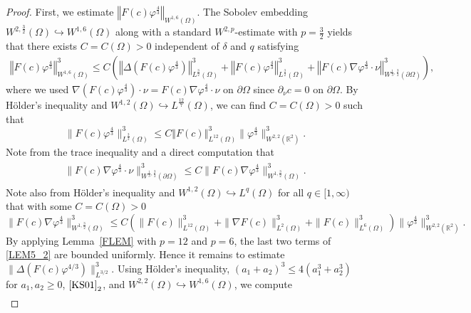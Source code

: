 \documentclass{amsart}
\numberwithin{equation}{section}
\newcommand{\R}{{ \mathbb{R}  }}
\newcommand{\bke}[1]{\left( #1 \right)}
\newcommand{\norm}[1]{\left\Vert #1 \right\Vert}
\begin{document}
\begin{proof}
First, we estimate $\norm{   F(c)  \varphi^{\frac{4}{3}}}_{W^{1,6}(\Omega)}$.
The Sobolev embedding $W^{2,\frac{3}{2}}(\Omega)\hookrightarrow W^{1,6}(\Omega)$ along with 
a standard $W^{2,p}$-estimate with $p=\frac{3}{2}$
yields that there exists $C=C(\Omega)>0$ independent of $\delta$ and $q$ satisfying
\begin{equation}\label{LEM5_2}
\begin{aligned}
 \norm{   F(c)  \varphi^{\frac{4}{3}}}_{W^{1,6}(\Omega)}^{3}
 \le C\bke{  \norm{\Delta \bke{  F(c)   \varphi^{\frac{4}{3}} } }_{L^{\frac{3}{2}}(\Omega)}^{3} +\norm{    F(c)   \varphi^{\frac{4}{3}}}_{L^{\frac{3}{2}}(\Omega)}^{3} +\norm{ F(c)\nabla \varphi^{\frac{4}{3}} \cdot \nu }_{W^{\frac{1}{3},\frac{3}{2}}(\partial\Omega)}^{3} },
\end{aligned}
\end{equation}
where we used
$\nabla(F(c)\varphi^{\frac{4}{3}})\cdot\nu=F(c)\nabla \varphi^{\frac{4}{3}} \cdot \nu$ on $\partial\Omega$ since $\partial_{\nu} c = 0$ on $\partial \Omega$. 
By H\"older's inequality and   $W^{1,2}(\Omega)\hookrightarrow L^{\frac{12}{7}}(\Omega)$, we can find $C=C(\Omega)>0$ such that
\[
\| F(c)   \varphi^{\frac{4}{3}}\|_{L^{\frac{3}{2}}(\Omega)}^{3}\le C \norm{ F(c)}_{L^{12}(\Omega)}^{3}\|\varphi^{\frac{4}{3}}\|_{W^{2,2}(\R^{2})}^{3}.
\]
Note   from the trace inequality and a direct computation that
\begin{align*}
\begin{aligned}
\| F(c)\nabla \varphi^{\frac{4}{3}} \cdot \nu \|_{W^{\frac{1}{3},\frac{3}{2}}(\partial\Omega)}^{3}\le C \|F(c)\nabla \varphi^{\frac{4}{3}} \|_{W^{1,\frac{3}{2}}( \Omega)}^{3}.
\end{aligned}
\end{align*}
Note also from H\"older's inequality and $W^{1,2}(\Omega)\hookrightarrow L^{q}(\Omega)$ for all $q\in[1,\infty)$ that with some $C=C(\Omega)>0$
\[
\|F(c)\nabla \varphi^{\frac{4}{3}} \|_{W^{1,\frac{3}{2}}( \Omega)}^{3}\le C(\|F(c)\|_{L^{12}(\Omega)}^{3}+\|\nabla F(c)\|_{L^{2}(\Omega)}^{3}+ \|F(c)\|_{L^{6}(\Omega)}^{3})\|\varphi^{\frac{4}{3}}\|_{W^{2,2}(\R^{2})}^{3}.
\]
By applying Lemma~\ref{FLEM} with $p=12$ and $p=6$, the last two terms of \eqref{LEM5_2} are bounded uniformly. 
Hence it remains to estimate $\|\Delta(F(c)\varphi^{4/3})\|_{L^{3/2}}^{3}$.
Using  H\"older's inequality,  $(a_{1}+a_{2})^{3}\le 4(a_{1}^{3}+a_{2}^{3})$ for $a_{1},a_{2}\ge0$,  $\eqref{KS01}_{2}$, and $W^{2,2}(\Omega)\hookrightarrow W^{1,6}(\Omega)$, we compute 
\begin{align*}

\end{align*}
\end{proof}
\end{document}
